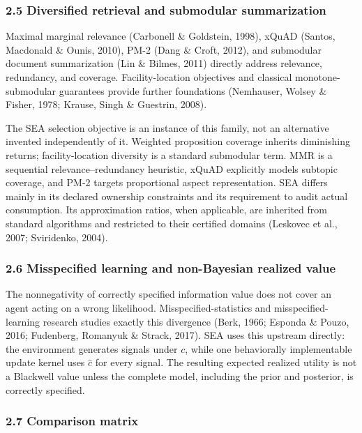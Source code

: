 \documentclass[
  11pt]{article}
\begin{document}
\subsubsection{2.5 Diversified retrieval and submodular
summarization}\label{diversified-retrieval-and-submodular-summarization}

Maximal marginal relevance (Carbonell \& Goldstein, 1998), xQuAD
(Santos, Macdonald \& Ounis, 2010), PM-2 (Dang \& Croft, 2012), and
submodular document summarization (Lin \& Bilmes, 2011) directly address
relevance, redundancy, and coverage. Facility-location objectives and
classical monotone-submodular guarantees provide further foundations
(Nemhauser, Wolsey \& Fisher, 1978; Krause, Singh \& Guestrin, 2008).

The SEA selection objective is an instance of this family, not an
alternative invented independently of it. Weighted proposition coverage
inherits diminishing returns; facility-location diversity is a standard
submodular term. MMR is a sequential relevance--redundancy heuristic,
xQuAD explicitly models subtopic coverage, and PM-2 targets proportional
aspect representation. SEA differs mainly in its declared ownership
constraints and its requirement to audit actual consumption. Its
approximation ratios, when applicable, are inherited from standard
algorithms and restricted to their certified domains (Leskovec et al.,
2007; Sviridenko, 2004).

\subsubsection{2.6 Misspecified learning and non-Bayesian realized
value}\label{misspecified-learning-and-non-bayesian-realized-value}

The nonnegativity of correctly specified information value does not
cover an agent acting on a wrong likelihood. Misspecified-statistics and
misspecified-learning research studies exactly this divergence (Berk,
1966; Esponda \& Pouzo, 2016; Fudenberg, Romanyuk \& Strack, 2017). SEA
uses this upstream directly: the environment generates signals under
\(c\), while one behaviorally implementable update kernel uses
\(\hat c\) for every signal. The resulting expected realized utility is
not a Blackwell value unless the complete model, including the prior and
posterior, is correctly specified.

\subsubsection{2.7 Comparison matrix}\label{comparison-matrix}
\end{document}
